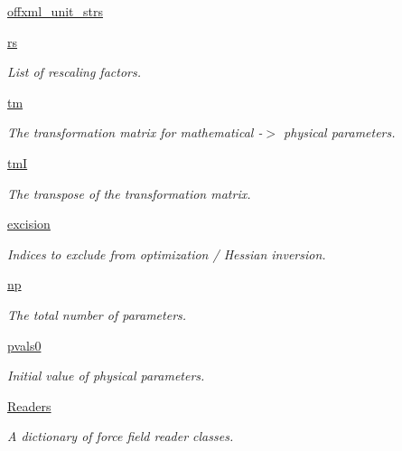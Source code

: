 \begin{DoxyCompactItemize}
\hyperlink{classsrc_1_1forcefield_1_1FF_aebe8114680302ada30020b6fc08c5ddb}{offxml\+\_\+unit\+\_\+strs}
\item 
\hyperlink{classsrc_1_1forcefield_1_1FF_a6ef3bc38784a4e68bc51bc06feb2e189}{rs}
\begin{DoxyCompactList}\small\item\em List of rescaling factors. \end{DoxyCompactList}\item 
\hyperlink{classsrc_1_1forcefield_1_1FF_adcb95c2460b4c0f7893377a8758da6c2}{tm}
\begin{DoxyCompactList}\small\item\em The transformation matrix for mathematical -\/$>$ physical parameters. \end{DoxyCompactList}\item 
\hyperlink{classsrc_1_1forcefield_1_1FF_a4069b737179fc0f4c02ce711564efcbf}{tmI}
\begin{DoxyCompactList}\small\item\em The transpose of the transformation matrix. \end{DoxyCompactList}\item 
\hyperlink{classsrc_1_1forcefield_1_1FF_aa3cf5182a95b90bb874651b6a1dcd820}{excision}
\begin{DoxyCompactList}\small\item\em Indices to exclude from optimization / Hessian inversion. \end{DoxyCompactList}\item 
\hyperlink{classsrc_1_1forcefield_1_1FF_af414a3fce0dc04e0e15bdd7ee1e0c8bb}{np}
\begin{DoxyCompactList}\small\item\em The total number of parameters. \end{DoxyCompactList}\item 
\hyperlink{classsrc_1_1forcefield_1_1FF_a2bf90abcc87be360349924cf972e0ae7}{pvals0}
\begin{DoxyCompactList}\small\item\em Initial value of physical parameters. \end{DoxyCompactList}\item 
\hyperlink{classsrc_1_1forcefield_1_1FF_a84c9dbd7f73d5faa08e3e04749305c94}{Readers}
\begin{DoxyCompactList}\small\item\em A dictionary of force field reader classes. \end{DoxyCompactList}\item 

\end{DoxyCompactItemize}
